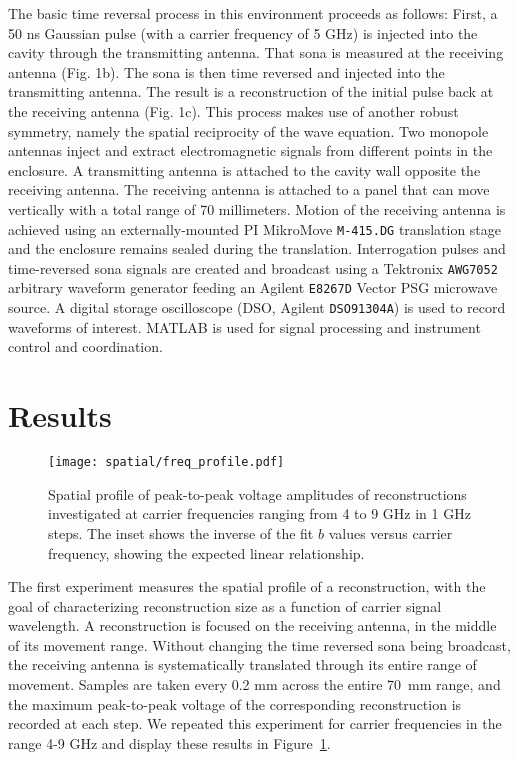 The basic time reversal process in this environment proceeds as follows: First, a 50 ns Gaussian pulse (with a carrier frequency of 5 GHz) is injected into the cavity through the transmitting antenna. That sona is measured at the receiving antenna (Fig. 1b). The sona is then time reversed and injected into the transmitting antenna. The result is a reconstruction of the initial pulse back at the receiving antenna (Fig. 1c). This process makes use of another robust symmetry, namely the spatial reciprocity of the wave equation.
Two monopole antennas inject and extract electromagnetic signals from different points in the enclosure. A transmitting antenna is attached to the cavity wall opposite the receiving antenna. The receiving antenna is attached to a panel that can move vertically with a total range of 70 millimeters. Motion of the receiving antenna is achieved using an externally-mounted PI MikroMove \texttt{M-415.DG} translation stage and the enclosure remains sealed during the translation. Interrogation pulses and time-reversed sona signals are created and broadcast using a Tektronix \texttt{AWG7052} arbitrary waveform generator feeding an Agilent \texttt{E8267D} Vector PSG microwave source. A digital storage oscilloscope (DSO, Agilent \texttt{DSO91304A}) is used to record waveforms of interest. MATLAB is used for signal processing and instrument control and coordination.

\section{Results}
\label{sec:spatial-profile-results}

\begin{figure}[t!]
\texttt{[image: spatial/freq\_profile.pdf]}
\caption{Spatial profile of peak-to-peak voltage amplitudes of reconstructions
investigated at carrier frequencies ranging from 4 to 9 GHz in 1 GHz
steps.  The inset shows the inverse of the fit $b$ values versus carrier frequency, showing the expected linear relationship.}
\label{fig:spatial-freq-profile}
\end{figure}

The first experiment measures the spatial profile of a reconstruction, with the goal of characterizing reconstruction size as a function of carrier signal wavelength. A reconstruction is focused on the receiving antenna, in the middle of its movement range. Without changing the time reversed sona being broadcast, the receiving antenna is systematically translated through its entire range of movement. Samples are taken every 0.2 mm across the entire 70~mm range, and the maximum peak-to-peak voltage of the corresponding reconstruction is recorded at each step. We repeated this experiment for carrier frequencies in the range 4-9 GHz and display these results in Figure~\ref{fig:spatial-freq-profile}.

